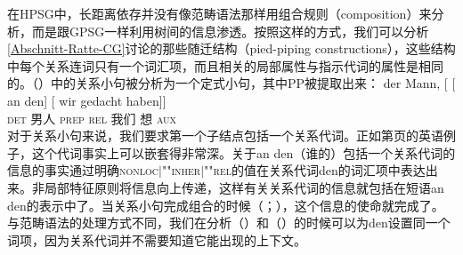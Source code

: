 在HPSG中，长距离依存并没有像范畴语法那样用组合规则（composition）来分析，而是跟GPSG一样利用树间的信息渗透。按照这样的方式，我们可以分析\ref{Abschnitt-Ratte-CG}讨论的那些随迁结构（pied-piping constructions），这些结构中每个关系连词只有一个词汇项，而且相关的局部属性与指示代词的属性是相同的。（）中的关系小句被分析为一个定式小句，其中PP被提取出来： 
\ea
\gll der Mann, [ [ an den] [ wir gedacht haben]]\\
     \textsc{det} 男人   {}        {}        \textsc{prep} \textsc{rel}  {}          我们 想 \textsc{aux}\\
\z
对于关系小句来说，我们要求第一个子结点包括一个关系代词。正如第\pageref{Beispiel-Minister}页的英语例子，这个代词事实上可以嵌套得非常深。关于an den（谁的）包括一个关系代词的信息的事实通过明确\textsc{nonloc$|$""inher$|$""rel}的值在关系代词den的词汇项中表达出来。非局部特征原则将信息向上传递，这样有关关系代词的信息就包括在短语an den的表示中了。当关系小句完成组合的时候（\citealp[\S~5]{ps2}；\citealp{Sag97a}），这个信息的使命就完成了。与范畴语法的处理方式不同，我们在分析（）和（）的时候可以为den设置同一个词项，因为关系代词并不需要知道它能出现的上下文。
